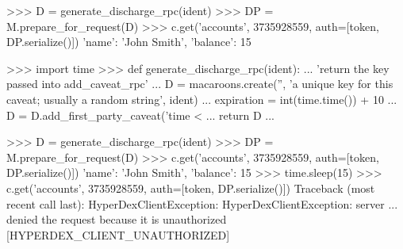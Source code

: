 \begin{pythoncode}
>>> D = generate_discharge_rpc(ident)
>>> DP = M.prepare_for_request(D)
>>> c.get('accounts', 3735928559, auth=[token, DP.serialize()])
{'name': 'John Smith', 'balance': 15}
\end{pythoncode}

\begin{pythoncode}
>>> import time
>>> def generate_discharge_rpc(ident):
...     'return the key passed into add_caveat_rpc'
...     D = macaroons.create('', 'a unique key for this caveat; usually a random string', ident)
...     expiration = int(time.time()) + 10
...     D = D.add_first_party_caveat('time < %
...     return D
...
\end{pythoncode}

\begin{pythoncode}
>>> D = generate_discharge_rpc(ident)
>>> DP = M.prepare_for_request(D)
>>> c.get('accounts', 3735928559, auth=[token, DP.serialize()])
{'name': 'John Smith', 'balance': 15}
>>> time.sleep(15)
>>> c.get('accounts', 3735928559, auth=[token, DP.serialize()])
Traceback (most recent call last):
HyperDexClientException: HyperDexClientException: server ... denied the request because it is unauthorized [HYPERDEX_CLIENT_UNAUTHORIZED]
\end{pythoncode}
